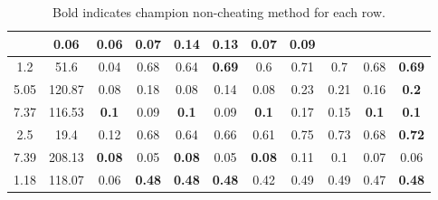\begin{table}
{\begin{tabular}{|c|c|c|c|c|c|c|c|c|c|c|}
  &0.06  &0.06  &0.07  &0.14  &0.13  &0.07  &\textbf{0.09}
  \\
 \hline 
1.2  &51.6  &0.04  &0.68  &0.64  &\textbf{0.69}
  &0.6  &0.71  &0.7  &0.68  &\textbf{0.69}
  \\
 \hline 
5.05  &120.87  &0.08  &0.18  &0.08  &0.14  &0.08  &0.23  &0.21  &0.16  &\textbf{0.2}
  \\
 \hline 
7.37  &116.53  &\textbf{0.1}
  &0.09  &\textbf{0.1}
  &0.09  &\textbf{0.1}
  &0.17  &0.15  &\textbf{0.1}
  &\textbf{0.1}
  \\
 \hline 
2.5  &19.4  &0.12  &0.68  &0.64  &0.66  &0.61  &0.75  &0.73  &0.68  &\textbf{0.72}
  \\
 \hline 
7.39  &208.13  &\textbf{0.08}
  &0.05  &\textbf{0.08}
  &0.05  &\textbf{0.08}
  &0.11  &0.1  &0.07  &0.06  \\
 \hline 
1.18  &118.07  &0.06  &\textbf{0.48}
  &\textbf{0.48}
  &\textbf{0.48}
  &0.42  &0.49  &0.49  &0.47  &\textbf{0.48}
  \\
 \hline 

\end{tabular}

}
\caption{Bold indicates champion non-cheating method for each row.}

\label{tab:overall}
\end{table}

